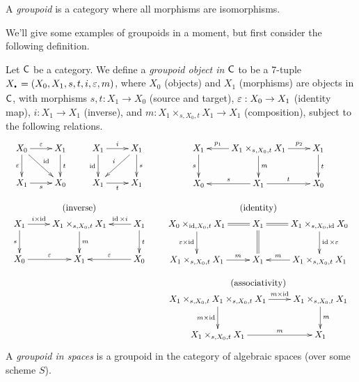 
 \begin{definition}
   A \emph{groupoid} is a category where all morphisms are isomorphisms.
 \end{definition}
 We'll give some examples of groupoids in a moment, but first consider the following
 definition.
 \begin{definition}
   Let $\text{\sf C}$ be a category. We define a \emph{groupoid object in $\text{\sf C}$} to be a 7-tuple
   $X_\udot=(X_0,X_1,s,t,i,\e,m)$, where $X_0$ (objects) and $X_1$ (morphisms) are
   objects in $\text{\sf C}$, with morphisms $s,t:X_1\to X_0$ (source and target), $\varepsilon:X_0\to X_1$
   (identity map), $i:X_1\to X_1$ (inverse), and $m:X_1\times_{s,X_0,t}X_1\to X_1$
   (composition), subject to the following relations.
   \[\begin{array}{c@{\qquad}c}
      \xymatrix{X_0 \ar[r]^\e\ar[d]_\e\ar[dr]^\id & X_1\ar[d]^t\\ X_1\ar[r]_s & X_0}\qquad
      \xymatrix{X_1\ar[r]^i\ar[d]_\id & X_1\ar[d]^s \ar[dl]_i\\ X_1\ar[r]_t & X_1} &
      \xymatrix{
        X_1\ar[d]_s & X_1\times_{s,X_0,t}X_1
        \ar[l]_<>(.5){p_1}\ar[r]^<>(.5){p_2}\ar[d]^m & X_1\ar[d]^t\\
        X_0 & X_1\ar[l]_s \ar[r]^t & X_0}
      \\ \rule{0pt}{2em}
      \text{(inverse)}&\text{(identity)}\\
      \xymatrix{
       X_1\ar[d]_s\ar[r]^<>(.5){i\times\id} & X_1\times_{s,X_0,t}X_1 \ar[d]^m
       & X_1 \ar[d]^t \ar[l]_<>(.5){\id\times i}\\
       X_0\ar[r]^\e & X_1 & X_0\ar[l]_\e} &
      \xymatrix{
        X_0\times_{\id,X_0,t}X_1 \ar@{=}[r] \ar[d]_{\e\times\id} & X_1\ar@{=}[r]\ar@{=}[d]
        & X_1\times_{s,X_0,\id}X_0 \ar[d]^{\id\times\e}\\
        X_1\times_{s,X_0,t}X_1 \ar[r]^<>(.5)m & X_1 & X_1\times_{s,X_0,t}X_1\ar[l]_<>(.5)m}
      \\ \rule{0pt}{2em}
      & \text{(associativity)}\\
      & \xymatrix{
        X_1\times_{s,X_0,t}X_1\times_{s,X_0,t}X_1 \ar[r]^<>(.5){m\times\id}
        \ar[d]_<>(.5){m\times\id} & X_1\times_{s,X_0,t}X_1 \ar[d]^m\\
        X_1\times_{s,X_0,t}X_1\ar[r]^<>(.5)m & X_1}
    \end{array}\]
     A \emph{groupoid in spaces} is a groupoid in the category of algebraic spaces (over
    some scheme $S$).
 \end{definition}
